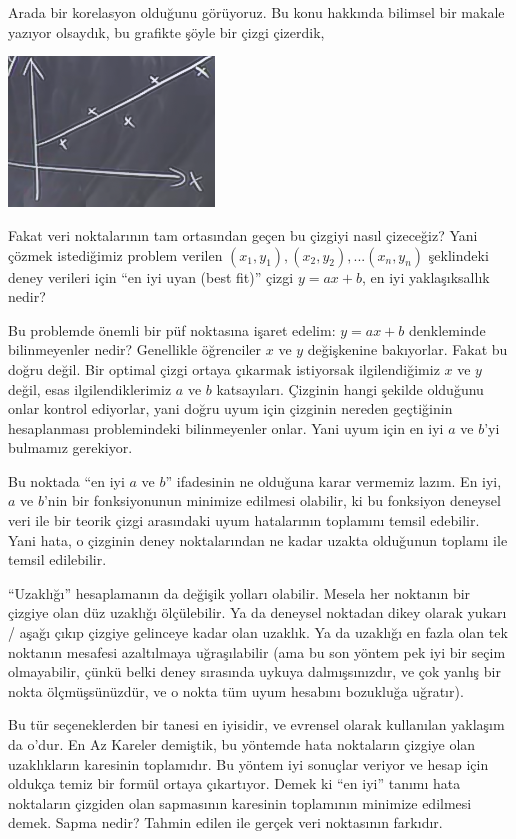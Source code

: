 \documentclass[12pt,fleqn]{article}\usepackage{../../common}
\begin{document}
Arada bir korelasyon olduğunu görüyoruz. Bu konu hakkında bilimsel bir makale
yazıyor olsaydık, bu grafikte şöyle bir çizgi çizerdik,

\includegraphics[height=4cm]{9_6.png}

Fakat veri noktalarının tam ortasından geçen bu çizgiyi nasıl çizeceğiz?  Yani
çözmek istediğimiz problem verilen $(x_1,y_1), (x_2,y_2),...(x_n,y_n)$
şeklindeki deney verileri için ``en iyi uyan (best fit)'' çizgi $y=ax + b$, en
iyi yaklaşıksallık nedir?

Bu problemde önemli bir püf noktasına işaret edelim: $y=ax + b$ denkleminde
bilinmeyenler nedir? Genellikle öğrenciler $x$ ve $y$ değişkenine
bakıyorlar. Fakat bu doğru değil. Bir optimal çizgi ortaya çıkarmak istiyorsak
ilgilendiğimiz $x$ ve $y$ değil, esas ilgilendiklerimiz $a$ ve $b$
katsayıları. Çizginin hangi şekilde olduğunu onlar kontrol ediyorlar, yani doğru
uyum için çizginin nereden geçtiğinin hesaplanması problemindeki bilinmeyenler
onlar. Yani uyum için en iyi $a$ ve $b$'yi bulmamız gerekiyor.

Bu noktada ``en iyi $a$ ve $b$'' ifadesinin ne olduğuna karar vermemiz
lazım. En iyi, $a$ ve $b$'nin bir fonksiyonunun minimize edilmesi olabilir,
ki bu fonksiyon deneysel veri ile bir teorik çizgi arasındaki uyum
hatalarının toplamını temsil edebilir. Yani hata, o çizginin deney
noktalarından ne kadar uzakta olduğunun toplamı ile temsil edilebilir.

``Uzaklığı'' hesaplamanın da değişik yolları olabilir. Mesela her noktanın
bir çizgiye olan düz uzaklığı ölçülebilir. Ya da deneysel noktadan dikey
olarak yukarı / aşağı çıkıp çizgiye gelinceye kadar olan uzaklık. Ya da
uzaklığı en fazla olan tek noktanın mesafesi azaltılmaya uğraşılabilir (ama
bu son yöntem pek iyi bir seçim olmayabilir, çünkü belki deney sırasında
uykuya dalmışsınızdır, ve çok yanlış bir nokta ölçmüşsünüzdür, ve o nokta
tüm uyum hesabını bozukluğa uğratır).

Bu tür seçeneklerden bir tanesi en iyisidir, ve evrensel olarak kullanılan
yaklaşım da o'dur. En Az Kareler demiştik, bu yöntemde hata noktaların
çizgiye olan uzaklıkların karesinin toplamıdır. Bu yöntem iyi sonuçlar
veriyor ve hesap için oldukça temiz bir formül ortaya çıkartıyor. Demek ki
``en iyi'' tanımı hata noktaların çizgiden olan sapmasının karesinin
toplamının minimize edilmesi demek. Sapma nedir? Tahmin edilen ile gerçek
veri noktasının farkıdır. 
\end{document}
